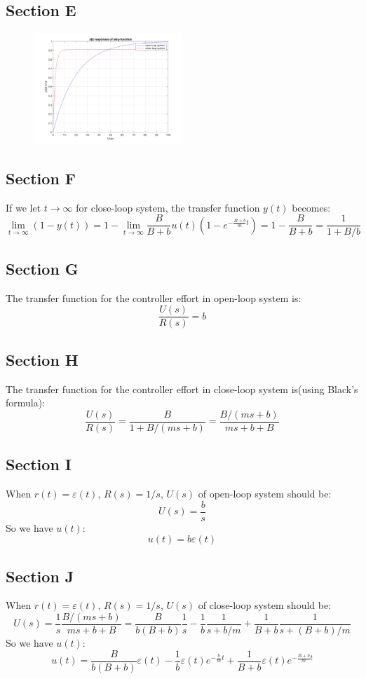 \documentclass[a4paper]{article}
\begin{document}
\subsection{Section E}
\begin{figure}[H]
\centering
\includegraphics[width = 0.5\textwidth]{pic/e.png}

\end{figure}

\subsection{Section F}
If we let $t\rightarrow \infty$ for close-loop system, the transfer function $y(t)$ becomes:
$$
\lim_{t\rightarrow \infty}(1 - y(t)) = 1- \lim_{t\rightarrow \infty}\frac{B}{B+b} u(t)(1-e^{-\frac{B+b}{m}t}) = 1-\frac{B}{B+b} = \frac{1}{1+B/b} 
$$

\subsection{Section G}
The transfer function for the controller effort in open-loop system is:
$$
\frac{U(s)}{R(s)} = b
$$
\subsection{Section H}
The transfer function for the controller effort in close-loop system is(using Black's formula):
$$
\frac{U(s)}{R(s)} = \frac{B}{1+B/(ms+b)} = \frac{B/(ms+b)}{ms+b+B}
$$
\subsection{Section I}
When $r(t) = \varepsilon(t)$, $R(s) = 1/s$, $U(s)$ of open-loop system should be:
$$
U(s) = \frac bs
$$
So we have $u(t)$:
$$
u(t) = b\varepsilon(t)
$$

\subsection{Section J}
When $r(t) = \varepsilon(t)$, $R(s) = 1/s$, $U(s)$ of close-loop system should be:
$$
U(s) = \frac 1s\frac{B/(ms+b)}{ms+b+B} = \frac{B}{b(B+b)}\frac 1s - \frac 1b\frac{1}{s+b/m}+\frac{1}{B+b}\frac{1}{s+(B+b)/m}
$$
So we have $u(t)$:
$$
u(t) = \frac{B}{b(B+b)}\varepsilon(t)- \frac 1b\varepsilon(t)e^{-\frac bm t} + \frac{1}{B+b}\varepsilon(t)e^{-\frac{B+b}{m}t}
$$
\end{document}
